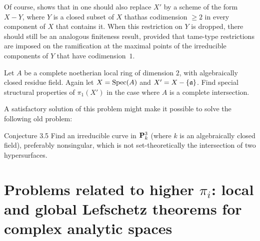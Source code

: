 Of course,  shows that in  one should also
replace $X'$ by a scheme of the form $X-Y$, where $Y$ is a closed subset
of $X$ that\pageoriginale has codimension $\geq 2$ in every component of $X$ that
contains it. When this restriction on $Y$ is dropped, there should still
be an analogous finiteness result, provided that \og tame\fg-type
restrictions are imposed on the ramification at the maximal points of
the irreducible components of $Y$ that have codimension~$1$.

\begin{probleme} \label{XIII.3.4}
Let $A$ be a complete noetherian local ring of dimension $2$, with
algebraically closed residue field. Again let $X=\operatorname{Spec}(A)$ and
$X'=X-\{\mathfrak{a}\}$. Find special structural properties of $\pi_1(X')$ in
the case where $A$ is a complete intersection.
\end{probleme}

A satisfactory solution of this problem might make it possible to solve
the following old problem:

\label{XIII.3.5}
\begin{enonce*}{Conjecture 3.5}
Find an irreducible curve in $\mathbf P^3_k$ (where $k$ is an algebraically
closed field), preferably nonsingular, which is not set-theoretically the
intersection of two hypersurfaces.
\end{enonce*}

\section[\texorpdfstring{Problems related to higher $\pi_i$}{Problems related to higher pi\textunderscore i}]{Problems related to higher
$\pi_i$: local and global Lefschetz theorems for complex analytic
spaces} \label{XIII.4}

